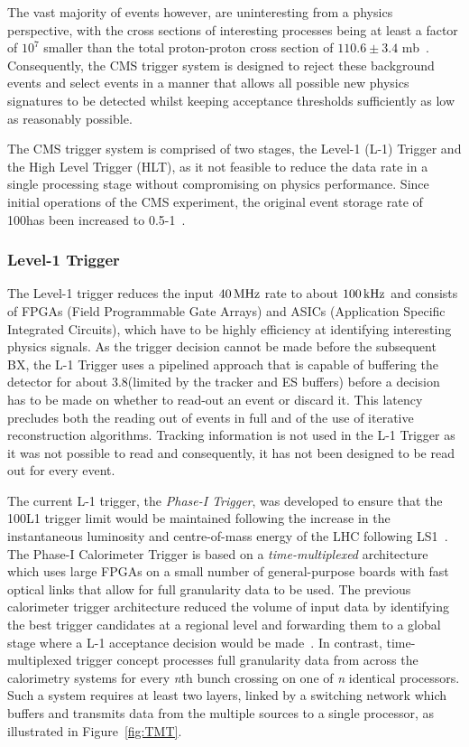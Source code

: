 The vast majority of events however, are uninteresting from a physics perspective, with the cross sections of interesting processes being at least a factor of $10^{7}$ smaller than the total proton-proton cross section of $110.6 \pm 3.4$ mb~\cite{Antchev:2017dia}.
Consequently, the CMS trigger system is designed to reject these background events and select events in a manner that allows all possible new physics signatures to be detected whilst keeping acceptance thresholds sufficiently as low as reasonably possible.

The CMS trigger system is comprised of two stages, the Level-1 (L-1) Trigger and the High Level Trigger (HLT), as it not feasible to reduce the data rate in a single processing stage without compromising on physics performance.
Since initial operations of the CMS experiment, the original event storage rate of 100\Hz has been increased to 0.5-1\kHz~\cite{Dasu:2000ge,phase1L1TDR}.

\subsubsection{Level-1 Trigger}\label{paragraph:L1}
The Level-1 trigger reduces the input $40\text{\,MHz}$ rate to about $100\text{\,kHz}$ and consists of FPGAs (Field Programmable Gate Arrays) and ASICs (Application Specific Integrated Circuits), which have to be highly efficiency at identifying interesting physics signals.
As the trigger decision cannot be made before the subsequent BX, the L-1 Trigger uses a pipelined approach that is capable of buffering the detector for about 3.8\mus (limited by the tracker and ES buffers) before a decision has to be made on whether to read-out an event or discard it. 
This latency precludes both the reading out of events in full and of the use of iterative reconstruction algorithms.
Tracking information is not used in the L-1 Trigger as it was not possible to read  and consequently, it has not been designed to be read out for every event.

The current L-1 trigger, the \emph{Phase-I Trigger}, was developed to ensure that the 100\kHz L1 trigger limit would be maintained following the increase in the instantaneous luminosity and centre-of-mass energy of the LHC following LS1~\cite{phase1L1TDR}.
The Phase-I Calorimeter Trigger is based on a \emph{time-multiplexed} architecture which uses large FPGAs on a small number of general-purpose boards with fast optical links that allow for full granularity data to be used.
The previous calorimeter trigger architecture reduced the volume of input data by identifying the best trigger candidates at a regional level and forwarding them to a global stage where a L-1 acceptance decision would be made~\cite{Tapper:2013yva}.
In contrast, time-multiplexed trigger concept processes full granularity data from across the calorimetry systems for every \emph{n}th bunch crossing on one of \emph{n} identical processors.
Such a system requires at least two layers, linked by a switching network which buffers and transmits data from the multiple sources to a single processor, as illustrated in Figure~\ref{fig:TMT}.


